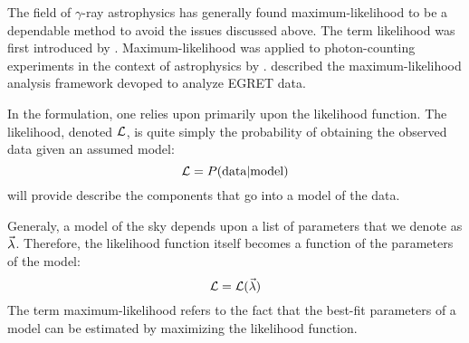 
The field of $\gamma$-ray astrophysics has generally found
maximum-likelihood to be a dependable method to avoid the issues
discussed above.  The term likelihood was first introduced by
\cite{likelihood_fisher_1925}.  Maximum-likelihood was applied
to photon-counting experiments in the context of astrophysics by
\cite{likelihood_cash_1979}.  \cite{likelihood_egret_mattox_1996}
described the maximum-likelihood analysis framework devoped to analyze
EGRET data.

In the formulation, one relies upon primarily upon the likelihood
function.  The likelihood, denoted $\mathcal{L}$, is quite simply the
probability of obtaining the observed data given an assumed model:
\begin{equation}
  \mathcal{L} = P(\text{data}|\text{model})
\end{equation}
 will provide describe the
components that go into a model of the data.

Generaly, a model of the sky depends upon a list
of parameters that we denote as $\vec\lambda$.
Therefore, the likelihood function itself becomes
a function of the parameters of the model:
\begin{equation}
  \mathcal{L} = \mathcal{L}(\vec\lambda)
\end{equation}
The term maximum-likelihood refers to the fact that
the best-fit parameters of a model can be estimated
by maximizing the likelihood function.


